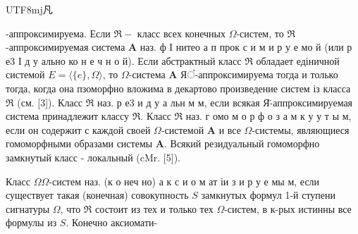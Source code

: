 \documentclass[10pt]{article}
\begin{document}
\begin{CJK}{UTF8}{mj}凡\end{CJK}-аппроксимируема. Если $\mathfrak{\Re}-$ класс всех конечных $\Omega$-систем, то $\mathfrak{\Re}$-аппроксимируемая система $\boldsymbol{A}$ наз. ф І нитео а п прок с и м и р у е мо й (или р е3 І д у ально ко н е ч н о й). Если абстрактный класс $\Re$ обладает едіничной системой $E=\langle\{e\}, \Omega\rangle$, то $\Omega$-система $\boldsymbol{A}$ Яं-аппроксимируема тогда и только тогда, когда она пзоморфно вложима в декартово произведение систем із класса $\Re$ (см. [3]). Класс $\Re$ наз. р е3 и д у а льн м м, если всякая Я̈-аппроксимируемая система принадлежит классу $\Re$. Класс $\Re$ наз. г омо м о р ф о з а м к у у т ы м, если он содержит с каждой своей $\Omega$-системой $\boldsymbol{A}$ и все $\Omega$-системы, являющиеся гомоморфными образами системы $\boldsymbol{A}$. Всякий резидуальный гомоморфно замкнутый класс - локальный (cMr. [5]).



Класс $\Omega \Omega$-систем наз. (к о неч но) а к с и о м ат іи з и р у е мы м, если существует такая (конечная) совокупность $S$ замкнутых формул 1-й ступени сигнатуры $\Omega$, что $\Re$ состоит из тех и только тех $\Omega$-систем, в к-рых истинны все формулы из $S$. Конечно аксиомати-
\end{document}
